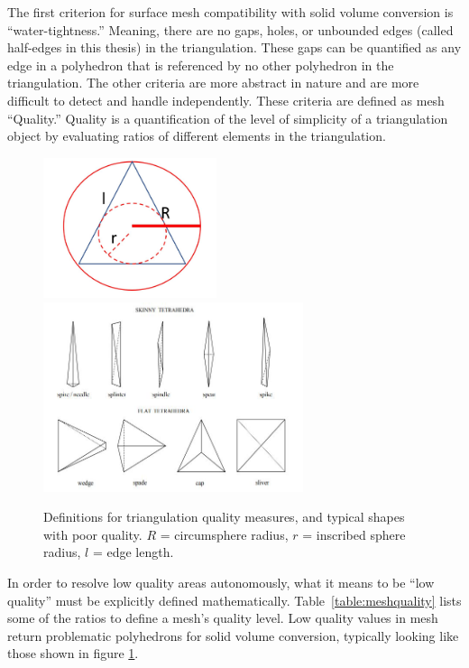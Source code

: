 \documentclass[12pt]{drexelthesis}
\begin{document}
The first criterion for surface mesh compatibility with solid volume conversion is “water-tightness.” Meaning, there are no gaps, holes, or unbounded edges (called half-edges in this thesis) in the triangulation. These gaps can be quantified as any edge in a polyhedron that is referenced by no other polyhedron in the triangulation.
The other criteria are more abstract in nature and are more difficult to detect and handle independently. These criteria are defined as mesh “Quality.” Quality is a quantification of the level of simplicity of a triangulation object by evaluating ratios of different elements in the triangulation.

\begin{figure}[!ht]
	\centering
		\includegraphics[width=2in]{triangulation_definitions.JPG}
		\includegraphics[width=3in]{bad_tetrahedra.JPG}
		\caption[Definitions for triangulation quality measures]
		{\centering Definitions for triangulation quality measures, and typical shapes with poor quality. $R$ = circumsphere radius, $r$ = inscribed sphere radius, $l$ = edge length.}
		\label{fig:meshquality}
\end{figure}

In order to resolve low quality areas autonomously, what it means to be ``low quality'' must be explicitly defined mathematically. Table~\ref{table:meshquality} lists some of the ratios to define a mesh's quality level. Low  quality  values  in  mesh  return  problematic  polyhedrons  for  solid volume  conversion,  typically  looking  like  those  shown  in  figure \ref{fig:meshquality}.
\end{document}

